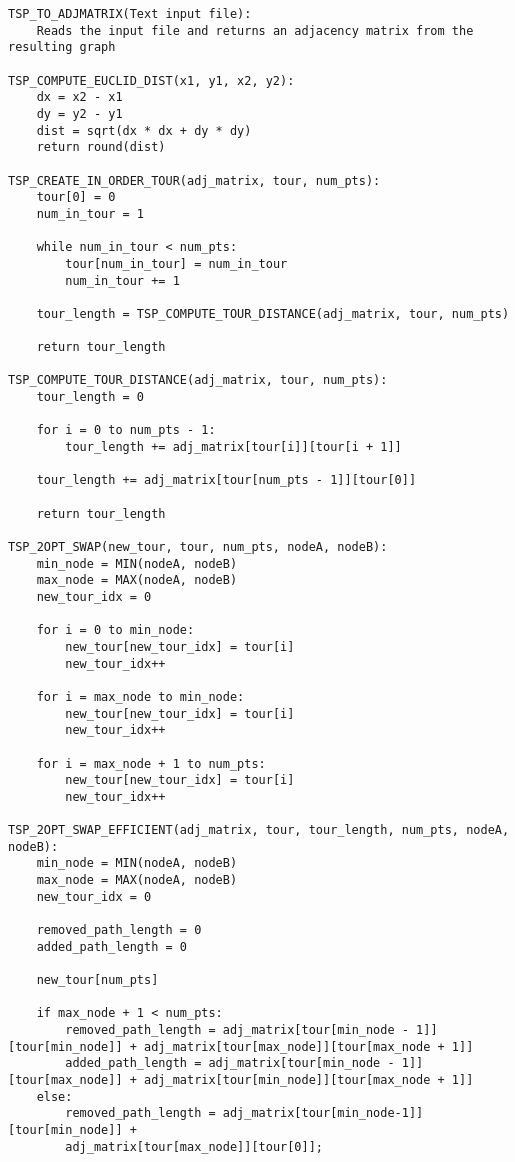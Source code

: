 \documentclass[../report/main.tex]{subfiles}
\begin{document}
\begin{verbatim}
TSP_TO_ADJMATRIX(Text input file):
    Reads the input file and returns an adjacency matrix from the resulting graph

TSP_COMPUTE_EUCLID_DIST(x1, y1, x2, y2):
    dx = x2 - x1
    dy = y2 - y1
    dist = sqrt(dx * dx + dy * dy)
    return round(dist)

TSP_CREATE_IN_ORDER_TOUR(adj_matrix, tour, num_pts):
    tour[0] = 0
    num_in_tour = 1

    while num_in_tour < num_pts:
        tour[num_in_tour] = num_in_tour
        num_in_tour += 1

    tour_length = TSP_COMPUTE_TOUR_DISTANCE(adj_matrix, tour, num_pts)

    return tour_length

TSP_COMPUTE_TOUR_DISTANCE(adj_matrix, tour, num_pts):
    tour_length = 0

    for i = 0 to num_pts - 1:
        tour_length += adj_matrix[tour[i]][tour[i + 1]]

    tour_length += adj_matrix[tour[num_pts - 1]][tour[0]]

    return tour_length

TSP_2OPT_SWAP(new_tour, tour, num_pts, nodeA, nodeB):
    min_node = MIN(nodeA, nodeB)
    max_node = MAX(nodeA, nodeB)
    new_tour_idx = 0

    for i = 0 to min_node:
        new_tour[new_tour_idx] = tour[i]
        new_tour_idx++

    for i = max_node to min_node:
        new_tour[new_tour_idx] = tour[i]
        new_tour_idx++

    for i = max_node + 1 to num_pts:
        new_tour[new_tour_idx] = tour[i]
        new_tour_idx++

TSP_2OPT_SWAP_EFFICIENT(adj_matrix, tour, tour_length, num_pts, nodeA, nodeB):
    min_node = MIN(nodeA, nodeB)
    max_node = MAX(nodeA, nodeB)
    new_tour_idx = 0

    removed_path_length = 0
    added_path_length = 0

    new_tour[num_pts]

    if max_node + 1 < num_pts:
        removed_path_length = adj_matrix[tour[min_node - 1]][tour[min_node]] + adj_matrix[tour[max_node]][tour[max_node + 1]]
        added_path_length = adj_matrix[tour[min_node - 1]][tour[max_node]] + adj_matrix[tour[min_node]][tour[max_node + 1]]
    else:
        removed_path_length = adj_matrix[tour[min_node-1]][tour[min_node]] + 
        adj_matrix[tour[max_node]][tour[0]];


\end{verbatim}
\end{document}
